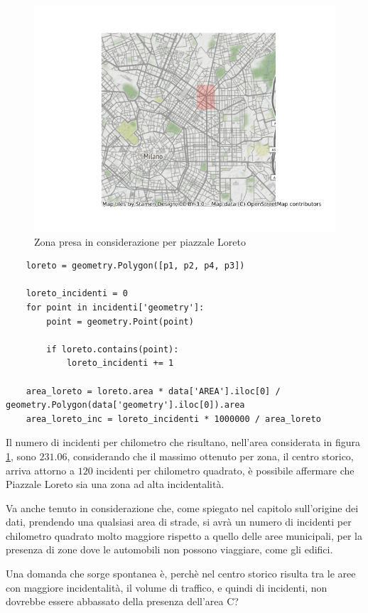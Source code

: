\documentclass[a4paper,12pt]{report}
\begin{document}
\begin{figure}
    \hfill\includegraphics[width=0.6\linewidth]{../src/municipi_milano/zona_loreto.png}\hspace*{\fill}
    \caption{Zona presa in considerazione per piazzale Loreto}
    \label{fig:zona-loreto}
\end{figure}

\begin{lstlisting}
    loreto = geometry.Polygon([p1, p2, p4, p3])

    loreto_incidenti = 0
    for point in incidenti['geometry']: 
        point = geometry.Point(point)

        if loreto.contains(point): 
            loreto_incidenti += 1

    area_loreto = loreto.area * data['AREA'].iloc[0] / geometry.Polygon(data['geometry'].iloc[0]).area
    area_loreto_inc = loreto_incidenti * 1000000 / area_loreto
\end{lstlisting}

Il numero di incidenti per chilometro che risultano, nell'area considerata in figura 
\ref{fig:zona-loreto}, sono $231.06$, considerando che il massimo ottenuto per zona, 
il centro storico, arriva attorno a $120$ incidenti per chilometro quadrato, è possibile affermare 
che Piazzale Loreto sia una zona ad alta incidentalità.

Va anche tenuto in considerazione che, come spiegato nel capitolo sull'origine dei dati, 
prendendo una qualsiasi area di strade, si avrà un numero di incidenti per chilometro quadrato 
molto maggiore rispetto a quello delle aree municipali, per la presenza di zone dove  
le automobili non possono viaggiare, come gli edifici.

Una domanda che sorge spontanea è, perchè nel centro storico risulta tra le aree con maggiore 
incidentalità, il volume di traffico, e quindi di incidenti, non dovrebbe essere abbassato 
della presenza dell'area C?
\end{document}
